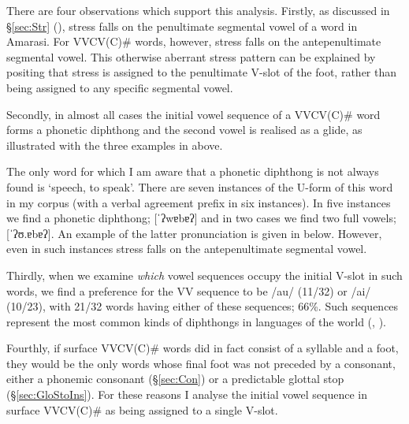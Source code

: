 There are four observations which support this analysis.
Firstly, as discussed in {\S}\ref{sec:Str} (),
stress falls on the penultimate segmental vowel of a word in Amarasi.
For VVCV(C){\#} words, however, stress falls on the antepenultimate segmental vowel.
This otherwise aberrant stress pattern can be explained by positing that
stress is assigned to the penultimate V-slot of the foot,
rather than being assigned to any specific segmental vowel.

Secondly, in almost all cases the initial vowel sequence of a VVCV(C){\#}
word forms a phonetic diphthong and the second vowel is realised as a glide,
as illustrated with the three examples in  above.

The only word for which I am aware that a phonetic diphthong
is not always found is  `speech, to speak'.
There are seven instances of the U-form of this word in my corpus
(with a verbal agreement prefix in six instances).
In five instances we find a phonetic diphthong; [ˈʔwɐbɐʔ]
and in two cases we find two full vowels; [ˈʔʊ.ɐbɐʔ].
An example of the latter pronunciation is given in  below.
However, even in such instances stress falls on the antepenultimate segmental vowel. 

\begin{exe}
\let\eachwordone=\textnormal \let\eachwordtwo=\ve
	\ex{\glll	[ʔanˈpa\sarc{ɛ}k sɪn \tbr{ˌ}ʔ\tbr{ʊ.ɐ}bɐʔ]\\
						\hp{[ʔ}a|n-paek siin uabaʔ \\
						\hp{[ʔ}{\a\n}-use {\siin} speech	\\
			\glt	\lh{[ʔa|}`{\ldots} using their language' \txrf{130920-1, 4.18}
						{\emb{130920-1-04-18.mp3}{\spk{}}{\apl}}}\label{ex:UsiTheLan}
\end{exe}

Thirdly, when we examine \emph{which} vowel sequences occupy the initial V-slot in such words,
we find a preference for the VV sequence to be /au/ (11/32) or /ai/ (10/23),
with 21/32 words having either of these sequences; 66\%.
Such sequences represent the most common kinds of diphthongs in languages of the world
(\citealt[36]{li86}, \citealt[40]{mi98}).

Fourthly, if surface VVCV(C){\#} words did in fact consist of a syllable and a foot,
they would be the only words whose final foot was not preceded by a consonant,
either a phonemic consonant ({\S}\ref{sec:Con})
or a predictable glottal stop ({\S}\ref{sec:GloStoIns}).
For these reasons I analyse the initial vowel sequence
in surface VVCV(C){\#} as being assigned to a single V-slot.

